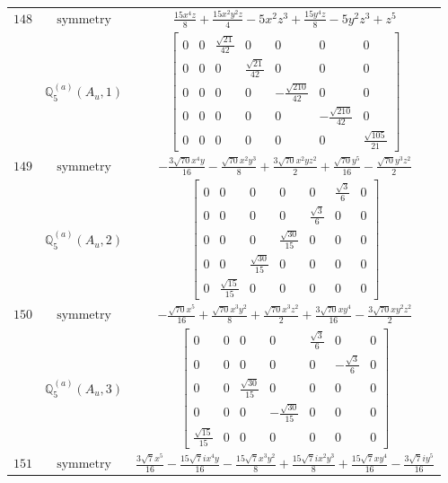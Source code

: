 \documentclass[fleqn,8pt,landscape]{jsarticle}
\begin{document}
\begin{longtable}{ccc}
$ 148 $ & $ \text{symmetry} $ & $ \frac{15 x^{4} z}{8} + \frac{15 x^{2} y^{2} z}{4} - 5 x^{2} z^{3} + \frac{15 y^{4} z}{8} - 5 y^{2} z^{3} + z^{5} $ \\
$  $ & $ \mathbb{Q}_{5}^{(a)}(A_{u},1) $ & $ \begin{bmatrix} 0 & 0 & \frac{\sqrt{21}}{42} & 0 & 0 & 0 & 0 \\ 0 & 0 & 0 & \frac{\sqrt{21}}{42} & 0 & 0 & 0 \\ 0 & 0 & 0 & 0 & - \frac{\sqrt{210}}{42} & 0 & 0 \\ 0 & 0 & 0 & 0 & 0 & - \frac{\sqrt{210}}{42} & 0 \\ 0 & 0 & 0 & 0 & 0 & 0 & \frac{\sqrt{105}}{21} \end{bmatrix} $ \\ \hline
$ 149 $ & $ \text{symmetry} $ & $ - \frac{3 \sqrt{70} x^{4} y}{16} - \frac{\sqrt{70} x^{2} y^{3}}{8} + \frac{3 \sqrt{70} x^{2} y z^{2}}{2} + \frac{\sqrt{70} y^{5}}{16} - \frac{\sqrt{70} y^{3} z^{2}}{2} $ \\
$  $ & $ \mathbb{Q}_{5}^{(a)}(A_{u},2) $ & $ \begin{bmatrix} 0 & 0 & 0 & 0 & 0 & \frac{\sqrt{3}}{6} & 0 \\ 0 & 0 & 0 & 0 & \frac{\sqrt{3}}{6} & 0 & 0 \\ 0 & 0 & 0 & \frac{\sqrt{30}}{15} & 0 & 0 & 0 \\ 0 & 0 & \frac{\sqrt{30}}{15} & 0 & 0 & 0 & 0 \\ 0 & \frac{\sqrt{15}}{15} & 0 & 0 & 0 & 0 & 0 \end{bmatrix} $ \\ \hline
$ 150 $ & $ \text{symmetry} $ & $ - \frac{\sqrt{70} x^{5}}{16} + \frac{\sqrt{70} x^{3} y^{2}}{8} + \frac{\sqrt{70} x^{3} z^{2}}{2} + \frac{3 \sqrt{70} x y^{4}}{16} - \frac{3 \sqrt{70} x y^{2} z^{2}}{2} $ \\
$  $ & $ \mathbb{Q}_{5}^{(a)}(A_{u},3) $ & $ \begin{bmatrix} 0 & 0 & 0 & 0 & \frac{\sqrt{3}}{6} & 0 & 0 \\ 0 & 0 & 0 & 0 & 0 & - \frac{\sqrt{3}}{6} & 0 \\ 0 & 0 & \frac{\sqrt{30}}{15} & 0 & 0 & 0 & 0 \\ 0 & 0 & 0 & - \frac{\sqrt{30}}{15} & 0 & 0 & 0 \\ \frac{\sqrt{15}}{15} & 0 & 0 & 0 & 0 & 0 & 0 \end{bmatrix} $ \\ \hline
$ 151 $ & $ \text{symmetry} $ & $ \frac{3 \sqrt{7} x^{5}}{16} - \frac{15 \sqrt{7} i x^{4} y}{16} - \frac{15 \sqrt{7} x^{3} y^{2}}{8} + \frac{15 \sqrt{7} i x^{2} y^{3}}{8} + \frac{15 \sqrt{7} x y^{4}}{16} - \frac{3 \sqrt{7} i y^{5}}{16} $ \\

\end{longtable}
\end{document}
